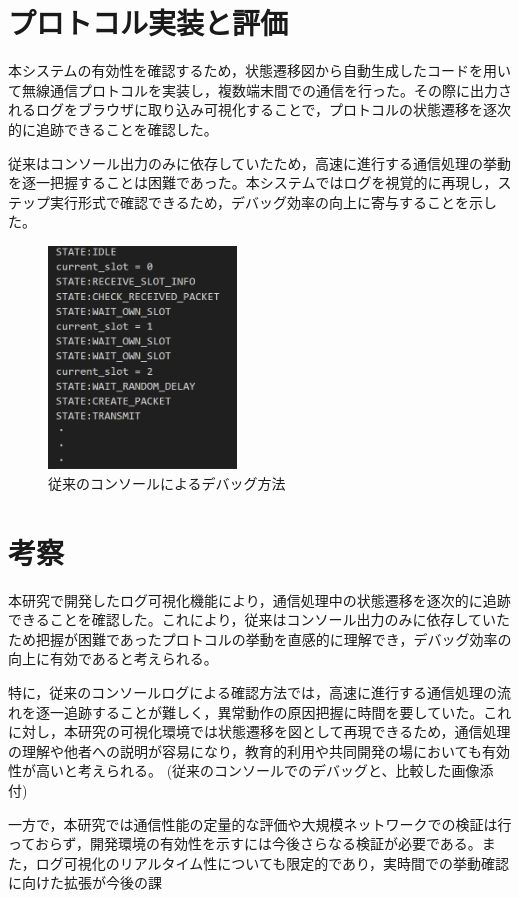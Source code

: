 \documentclass[paper]{ieicej}
\begin{document}
\section{プロトコル実装と評価}
本システムの有効性を確認するため，状態遷移図から自動生成したコードを用いて無線通信プロトコルを実装し，複数端末間での通信を行った。その際に出力されるログをブラウザに取り込み可視化することで，プロトコルの状態遷移を逐次的に追跡できることを確認した。

従来はコンソール出力のみに依存していたため，高速に進行する通信処理の挙動を逐一把握することは困難であった。本システムではログを視覚的に再現し，ステップ実行形式で確認できるため，デバッグ効率の向上に寄与することを示した。
\begin{figure}[tb]
  \centering
  \includegraphics[width=50mm]{./images/old_debug.png}
  \caption{従来のコンソールによるデバッグ方法}
  \label{fig:old-debug}
\end{figure}

\section{考察}
本研究で開発したログ可視化機能により，通信処理中の状態遷移を逐次的に追跡できることを確認した。これにより，従来はコンソール出力のみに依存していたため把握が困難であったプロトコルの挙動を直感的に理解でき，デバッグ効率の向上に有効であると考えられる。

特に，従来のコンソールログによる確認方法では，高速に進行する通信処理の流れを逐一追跡することが難しく，異常動作の原因把握に時間を要していた。これに対し，本研究の可視化環境では状態遷移を図として再現できるため，通信処理の理解や他者への説明が容易になり，教育的利用や共同開発の場においても有効性が高いと考えられる。
(従来のコンソールでのデバッグと、比較した画像添付)

一方で，本研究では通信性能の定量的な評価や大規模ネットワークでの検証は行っておらず，開発環境の有効性を示すには今後さらなる検証が必要である。また，ログ可視化のリアルタイム性についても限定的であり，実時間での挙動確認に向けた拡張が今後の課
\end{document}
